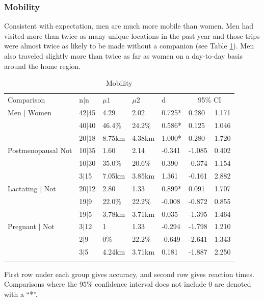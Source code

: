 		\subsubsection{Mobility}
		\label{sec:3.1.2}
Consistent with expectation, men are much more mobile than women.  Men had visited more than twice as many unique locations in the past year and those trips were almost twice as likely to be made without a companion (see Table \ref{tab:mob}).  Men also traveled slightly more than twice as far as women on a day-to-day basis around the home region.  

\begin{table}[h!]
\caption{Mobility}
\label{tab:mob}  
\begin{tabular}{lllllll}
\hline\noalign{\smallskip}
Comparison & \phantom{0}n$|$n & $\mu1$ & $\mu2$ & d & \multicolumn{2}{c}{95\% CI} \\
\noalign{\smallskip}\hline\noalign{\smallskip}
Men $|$ Women & 42$|$45 & 4.29 & 2.02 & \phantom{-}0.725* & \phantom{-}0.280 & \phantom{-}1.171 \\
& 40$|$40 & 46.4\% & 24.2\% & \phantom{-}0.586* & \phantom{-}0.125 & \phantom{-}1.046 \\
& 20$|$18 & 8.75km & 4.38km & \phantom{-}1.000* & \phantom{-}0.280 & \phantom{-}1.720 \\
Postmenopausal Not & 10$|$35 & 1.60 & 2.14 & -0.341 & -1.085 & \phantom{-}0.402 \\
& 10$|$30 & 35.0\% & 20.6\% & \phantom{-}0.390 & -0.374 & \phantom{-}1.154 \\
& \phantom{0}3$|$15 & 7.05km & 3.85km & \phantom{-}1.361 & -0.161 & \phantom{-}2.882 \\
Lactating $|$ Not & 20$|$12 & 2.80 & 1.33 & \phantom{-}0.899* & \phantom{-}0.091 & \phantom{-}1.707 \\
& 19$|$9 & 22.0\% & 22.2\%  & -0.008 & -0.872 & \phantom{-}0.855 \\
& 19$|$5 & 3.78km & 3.71km & \phantom{-}0.035 & -1.395 & \phantom{-}1.464 \\
Pregnant $|$ Not & 3$|$12 & 1 & 1.33 & -0.294 & -1.798 & \phantom{-}1.210 \\
& 2$|$9 & 0\% & 22.2\%  & -0.649 & -2.641 & \phantom{-}1.343\\
& 3$|$5 & 4.24km & 3.71km & \phantom{-}0.181 & -1.887 & \phantom{-}2.250 \\
\noalign{\smallskip}\hline
\end{tabular}\par
\bigskip
First row under each group gives accuracy, and second row gives reaction times.  Comparisons where the 95\% confidence interval does not include 0 are denoted with a ``*''.
\end{table}		

